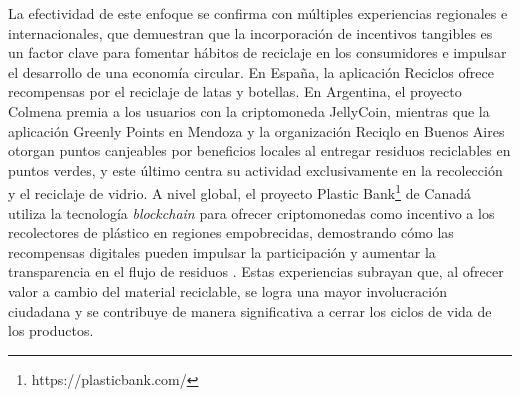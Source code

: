 La efectividad de este enfoque se confirma con múltiples experiencias regionales e internacionales, que demuestran que la incorporación de incentivos tangibles es un factor clave para fomentar hábitos de reciclaje en los consumidores e impulsar el desarrollo de una economía circular. En España, la aplicación Reciclos \cite{reciclos2024} ofrece recompensas por el reciclaje de latas y botellas. En Argentina, el proyecto Colmena \cite{colmena2024} premia a los usuarios con la \gls{criptomoneda} JellyCoin, mientras que la aplicación Greenly Points \cite{greenlypoints2024} en Mendoza y la organización Reciqlo en Buenos Aires \cite{innovar2024vidrio} otorgan puntos canjeables por beneficios locales al entregar residuos reciclables en puntos verdes, y este último centra su actividad exclusivamente en la recolección y el reciclaje de vidrio. A nivel global, el proyecto Plastic Bank\footnote{https://plasticbank.com/} de Canadá utiliza la tecnología \textit{blockchain} para ofrecer criptomonedas como incentivo a los recolectores de plástico en regiones empobrecidas, demostrando cómo las recompensas digitales pueden impulsar la participación y aumentar la transparencia en el flujo de residuos \cite{baralla2023waste}. Estas experiencias subrayan que, al ofrecer valor a cambio del material reciclable, se logra una mayor involucración ciudadana y se contribuye de manera significativa a cerrar los ciclos de vida de los productos.


